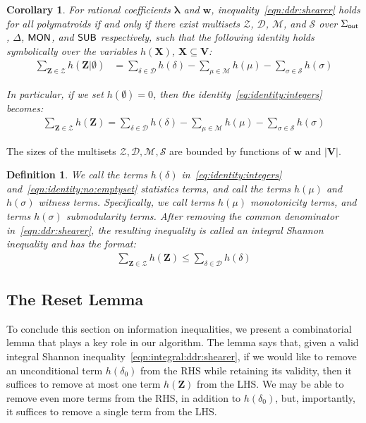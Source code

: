 \documentclass[10pt,a4paper]{article}
\newtheorem{corollary}{Corollary}[section]
\newtheorem{definition}{Definition}[section]
\newcommand{\calM}{\mathcal M}
\newcommand{\calS}{\mathcal S}
\newcommand{\calD}{\mathcal D}
\newcommand{\calZ}{\mathcal Z}
\newcommand{\out}{\text{\sf out}}
\newcommand{\mon}{\text{\sf MON}}
\newcommand{\sub}{\text{\sf SUB}}
\begin{document}
\begin{corollary} \label{cor:integral:witness}
For rational coefficients $\bm\lambda$ and $\bm w$, inequality~\eqref{eqn:ddr:shearer} holds for all
polymatroids if and only if there exist multisets $\calZ$, $\calD$, $\calM$, and
$\calS$ over $\Sigma_{\out}$, $\Delta$, $\mon$, and $\sub$ respectively, such that the
following identity holds symbolically over the variables $h(\bm X)$, $\bm X \subseteq \bm
V$:
%
\begin{align}
  \sum_{\bm Z \in \calZ} h(\bm Z|\emptyset)
    &= \sum_{\delta \in \calD} h(\delta)
    - \sum_{\mu \in \calM} h(\mu)
    - \sum_{\sigma \in \calS} h(\sigma) \label{eq:identity:integers}
\end{align}

In particular, if we set $h(\emptyset) = 0$, then the identity~\eqref{eq:identity:integers} becomes:
\begin{align}
    \sum_{\bm Z \in \calZ} h(\bm Z)
      = \sum_{\delta \in \calD} h(\delta)
      - \sum_{\mu \in \calM} h(\mu)
      - \sum_{\sigma \in \calS} h(\sigma)
      \label{eqn:identity:no:emptyset}
\end{align}
\end{corollary}
The sizes of the multisets $\calZ, \calD, \calM, \calS$ are bounded by functions of
$\bm w$ and $|\bm V|$.


\begin{definition}
We call the terms $h(\delta)$ in~\eqref{eq:identity:integers} and~\eqref{eqn:identity:no:emptyset} {\em
statistics terms}, and call the terms $h(\mu)$ and
$h(\sigma)$ {\em witness terms}.
Specifically, we call terms $h(\mu)$ {\em monotonicity terms}, and terms $h(\sigma)$ {\em submodularity terms}.
After removing the common denominator in~\eqref{eqn:ddr:shearer}, the resulting inequality
is called an {\em integral Shannon inequality} and has the format:
\begin{align}
\sum_{\bm Z \in \calZ}h(\bm Z) \leq \sum_{\delta \in \calD} h(\delta)
\label{eqn:integral:ddr:shearer}
\end{align}
\end{definition}

\subsection{The Reset Lemma}
\label{subsec:reset}

To conclude this section on information inequalities, we present a combinatorial lemma that
plays a key role in our algorithm. The lemma says that, given a valid integral Shannon
inequality~\eqref{eqn:integral:ddr:shearer}, if we would like to remove an unconditional
term $h(\delta_{0})$ from the RHS while retaining its validity, then it suffices to remove
at most one term $h(\bm Z)$ from the LHS. We may be able to remove even more terms from the
RHS, in addition to $h(\delta_{0})$, but, importantly, it suffices to remove a single term
from the LHS.
\end{document}
